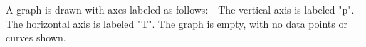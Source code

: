 A graph is drawn with axes labeled as follows:  
- The vertical axis is labeled "p".  
- The horizontal axis is labeled "T".  
The graph is empty, with no data points or curves shown.